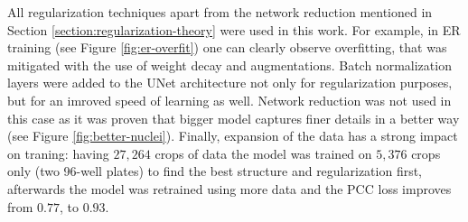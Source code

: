All regularization techniques apart from the network reduction mentioned in Section \ref{section:regularization-theory} were used in this work. For example, in ER training (see Figure \ref{fig:er-overfit}) one can clearly observe overfitting, that was mitigated with the use of weight decay and augmentations. Batch normalization layers were added to the UNet architecture not only for regularization purposes, but for an imroved speed of learning as well. Network reduction was not used in this case as it was proven that bigger model captures finer details in a better way (see Figure \ref{fig:better-nuclei}). Finally, expansion of the data has a strong impact on traning: having $27,264$ crops of data the model was trained on $5,376$ crops only (two 96-well plates) to find the best structure and regularization first, afterwards the model was retrained using more data and the PCC loss improves from $0.77$, to $0.93$.